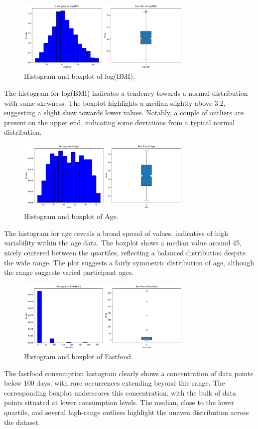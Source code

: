 \documentclass{rapport}
\begin{document}
\begin{figure}[H]
    \centering
    \includegraphics[width=0.75\textwidth]{logbmi_hist_box.png}
    \caption{\small Histogram and boxplot of log(BMI).}
    \label{fig:logbmi}
\end{figure}
\noindent
The histogram for log(BMI) indicates a tendency towards a normal distribution with some skewness. The boxplot highlights a median slightly above 3.2, suggesting a slight skew towards lower values. Notably, a couple of outliers are present on the upper end, indicating some deviations from a typical normal distribution.


\begin{figure}[H]
    \centering
    \includegraphics[width=0.75\textwidth]{age_hist_box.png}
    \caption{\small Histogram and boxplot of Age.}
    \label{fig:age}
\end{figure}
\noindent
The histogram for age reveals a broad spread of values, indicative of high variability within the age data. The boxplot shows a median value around 45, nicely centered between the quartiles, reflecting a balanced distribution despite the wide range. The plot suggests a fairly symmetric distribution of age, although the range suggests varied participant ages.


\begin{figure}[H]
    \centering
    \includegraphics[width=0.75\textwidth]{fastfood_hist_box.png}
    \caption{\small Histogram and boxplot of Fastfood.}
    \label{fig:fastfood}
\end{figure}
\noindent
The fastfood consumption histogram clearly shows a concentration of data points below 100 days, with rare occurrences extending beyond this range. The corresponding boxplot underscores this concentration, with the bulk of data points situated at lower consumption levels. The median, close to the lower quartile, and several high-range outliers highlight the uneven distribution across the dataset.
\end{document}
